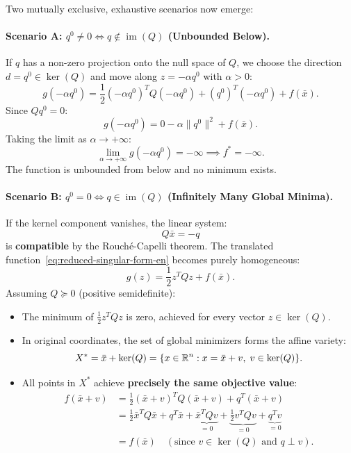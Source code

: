Two mutually exclusive, exhaustive scenarios now emerge:

\paragraph{Scenario A: $q^0 \neq 0 \iff q \notin \operatorname{im}(Q)$ (Unbounded Below).}
If $q$ has a non-zero projection onto the null space of $Q$, we choose the direction $d = q^0 \in \ker(Q)$ and move along $z = -\alpha q^0$ with $\alpha > 0$:
\begin{equation}
    g(-\alpha q^0) = \frac{1}{2} (-\alpha q^0)^T Q (-\alpha q^0) + (q^0)^T (-\alpha q^0) + f(\bar{x}).
\end{equation}
Since $Q q^0 = 0$:
\begin{equation}
    g(-\alpha q^0) = 0 - \alpha \|q^0\|^2 + f(\bar{x}).
\end{equation}
Taking the limit as $\alpha \to +\infty$:
\begin{equation}
    \lim_{\alpha \to +\infty} g(-\alpha q^0) = -\infty \implies f^* = -\infty.
\end{equation}
The function is unbounded from below and no minimum exists.

\paragraph{Scenario B: $q^0 = 0 \iff q \in \operatorname{im}(Q)$ (Infinitely Many Global Minima).}
If the kernel component vanishes, the linear system:
\begin{equation}
    Q \bar{x} = -q
\end{equation}
is \textbf{compatible} by the Rouch\'e-Capelli theorem. The translated function~\eqref{eq:reduced-singular-form-en} becomes purely homogeneous:
\begin{equation}
    g(z) = \frac{1}{2} z^T Q z + f(\bar{x}).
\end{equation}
Assuming $Q \succeq 0$ (positive semidefinite):
\begin{itemize}
    \item The minimum of $\frac{1}{2} z^T Q z$ is zero, achieved for every vector $z \in \ker(Q)$.
    \item In original coordinates, the set of global minimizers forms the affine variety:
    \begin{equation}
        X^* = \bar{x} + \ker(Q) = \{x \in \mathbb{R}^n : x = \bar{x} + v, \; v \in \ker(Q)\}.
    \end{equation}
    \item All points in $X^*$ achieve \textbf{precisely the same objective value}:
    \begin{align}
        f(\bar{x} + v) &= \frac{1}{2} (\bar{x} + v)^T Q (\bar{x} + v) + q^T (\bar{x} + v) \nonumber \\
        &= \frac{1}{2} \bar{x}^T Q \bar{x} + q^T \bar{x} + \underbrace{\bar{x}^T Q v}_{= 0} + \underbrace{\frac{1}{2} v^T Q v}_{= 0} + \underbrace{q^T v}_{= 0} \nonumber \\
        &= f(\bar{x}) \quad (\text{since } v \in \ker(Q) \text{ and } q \perp v).
    \end{align}
\end{itemize}

